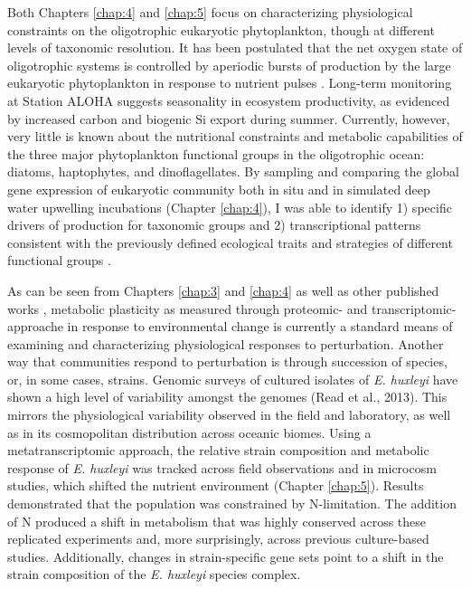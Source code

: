 Both Chapters \ref{chap:4} and \ref{chap:5} focus on characterizing physiological constraints on the oligotrophic eukaryotic phytoplankton, though at different levels of taxonomic resolution. It has been postulated that the net oxygen state of oligotrophic systems is controlled by aperiodic bursts of production by the large eukaryotic phytoplankton in response to nutrient pulses \citep{Karl2003}. Long-term monitoring at Station ALOHA suggests seasonality in ecosystem productivity, as evidenced by increased carbon and biogenic Si export during summer. Currently, however, very little is known about the nutritional constraints and metabolic capabilities of the three major phytoplankton functional groups in the oligotrophic ocean: diatoms, haptophytes, and dinoflagellates. By sampling and comparing the global gene expression of eukaryotic community both in situ and in simulated deep water upwelling incubations (Chapter \ref{chap:4}), I was able to identify 1) specific drivers of production for taxonomic groups and 2) transcriptional patterns consistent with the previously defined ecological traits and strategies of different functional groups \citep{Margalef1978}. \par

As can be seen from Chapters \ref{chap:3} and \ref{chap:4} as well as other published works \citep{Dyhrman2006, Dyhrman2012, Wurch2011, Bertrand2012a, Jones2013, Bender2014, Frischkorn2014}, metabolic plasticity as measured through proteomic- and transcriptomic-approache in response to environmental change is currently a standard means of examining and characterizing physiological responses to perturbation. Another way that communities respond to perturbation is through succession of species, or, in some cases, strains. Genomic surveys of cultured isolates of \textit{E. huxleyi} have shown a high level of variability amongst the genomes (Read et al., 2013). This mirrors the physiological variability observed in the field and laboratory, as well as in its cosmopolitan distribution across oceanic biomes. Using a metatranscriptomic approach, the relative strain composition and metabolic response of \textit{E. huxleyi} was tracked across field observations and in microcosm studies, which shifted the nutrient environment (Chapter \ref{chap:5}). Results demonstrated that the population was constrained by N-limitation. The addition of N produced a shift in metabolism that was highly conserved across these replicated experiments and, more surprisingly, across previous culture-based studies. Additionally, changes in strain-specific gene sets point to a shift in the strain composition of the \textit{E. huxleyi} species complex. 
